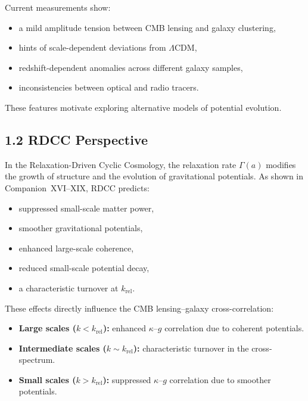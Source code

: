 \documentclass[11pt,a4paper]{article}
\begin{document}
Current measurements show:

\begin{itemize}
    \item a mild amplitude tension between CMB lensing and galaxy clustering,
    \item hints of scale-dependent deviations from $\Lambda$CDM,
    \item redshift-dependent anomalies across different galaxy samples,
    \item inconsistencies between optical and radio tracers.
\end{itemize}

These features motivate exploring alternative models of potential evolution.

\subsection*{1.2 RDCC Perspective}

In the Relaxation-Driven Cyclic Cosmology, the relaxation rate $\Gamma(a)$ modifies the 
growth of structure and the evolution of gravitational potentials. As shown in 
Companion~XVI–XIX, RDCC predicts:

\begin{itemize}
    \item suppressed small-scale matter power,
    \item smoother gravitational potentials,
    \item enhanced large-scale coherence,
    \item reduced small-scale potential decay,
    \item a characteristic turnover at $k_{\mathrm{rel}}$.
\end{itemize}

These effects directly influence the CMB lensing–galaxy cross-correlation:

\begin{itemize}
    \item \textbf{Large scales ($k < k_{\mathrm{rel}}$):}
    enhanced $\kappa$–$g$ correlation due to coherent potentials.
    \item \textbf{Intermediate scales ($k \sim k_{\mathrm{rel}}$):}
    characteristic turnover in the cross-spectrum.
    \item \textbf{Small scales ($k > k_{\mathrm{rel}}$):}
    suppressed $\kappa$–$g$ correlation due to smoother potentials.
\end{itemize}
\end{document}
